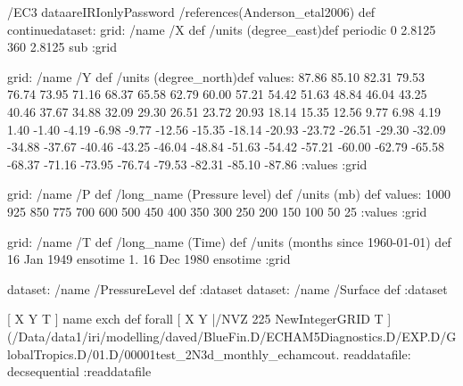 \begin{ingrid}
/EC3 dataareIRIonlyPassword
/references(Anderson_etal2006) def
continuedataset:
grid:
/name /X def
/units (degree_east)def
 periodic
 0 2.8125 360  2.8125 sub
:grid

grid:
/name /Y def
/units (degree_north)def
values:
87.86 85.10 82.31 79.53 76.74 73.95 71.16 68.37
 65.58 62.79 60.00 57.21 54.42 51.63 48.84 46.04 43.25 40.46
 37.67 34.88 32.09 29.30 26.51 23.72 20.93 18.14 15.35 12.56
 9.77  6.98  4.19  1.40   -1.40   -4.19   -6.98   -9.77  -12.56  -15.35
 -18.14  -20.93  -23.72  -26.51  -29.30  -32.09  -34.88  -37.67  -40.46  -43.25
 -46.04  -48.84  -51.63  -54.42  -57.21  -60.00  -62.79  -65.58  -68.37  -71.16
 -73.95  -76.74  -79.53  -82.31  -85.10  -87.86
:values
:grid

grid:
/name /P def
/long_name (Pressure level) def
/units (mb) def
values:
1000 925 850 775 700 600 500 450 400 350 300 250 200 150 100 50 25
:values
:grid

grid:
/name /T def
/long_name (Time) def
/units (months since 1960-01-01) def
16 Jan 1949 ensotime
1.
16 Dec 1980 ensotime
:grid

dataset: /name /PressureLevel def :dataset
dataset: /name /Surface def :dataset

[ X Y T ] { name exch def } forall
[ X Y |/NVZ 225 NewIntegerGRID T ]
(/Data/data1/iri/modelling/daved/BlueFin.D/ECHAM5Diagnostics.D/EXP.D/GlobalTropics.D/01.D/00001test_2N3d_monthly_echamcout.%
readdatafile:
decsequential
:readdatafile


\end{ingrid}
